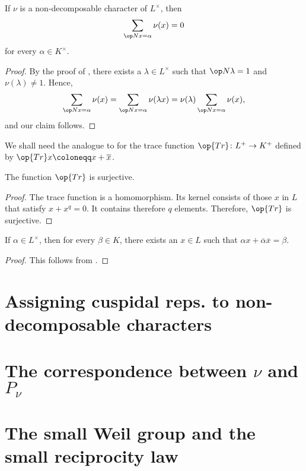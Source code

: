 \documentclass[../main.tex]{subfiles}
\begin{document}
\begin{lemma}
	If $\nu$ is a non-decomposable character of $L^\times$, then
	\[\sum_{\op Nx=\alpha}\nu(x)=0\]
	for every $\alpha\in K^\times$.
\end{lemma}
\begin{proof}
	By the proof of , there exists a $\lambda\in L^\times$ such that $\op N\lambda=1$ and $\nu(\lambda)\ne1$. Hence,
	\[\sum_{\op Nx=\alpha}\nu(x)=\sum_{\op Nx=\alpha}\nu(\lambda x)=\nu(\lambda)\sum_{\op Nx=\alpha}\nu(x),\]
	and our claim follows.
\end{proof}

We shall need the analogue to  for the trace function $\op{Tr}\colon L^+\to K^+$ defined by $\op{Tr}x\coloneqq x+\overline x$.
\begin{lemma} \label{lem:tr-epi}
	The function $\op{Tr}$ is surjective.
\end{lemma}
\begin{proof}
	The trace function is a homomorphism. Its kernel consists of those $x$ in $L$ that satisfy $x+x^q=0$. It contains therefore $q$ elements. Therefore, $\op{Tr}$ is surjective.
\end{proof}
\begin{corollary}
	If $\alpha\in L^\times$, then for every $\beta\in K$, there exists an $x\in L$ such that $\alpha x+\overline\alpha\overline x=\beta$.
\end{corollary}
\begin{proof}
	This follows from .
\end{proof}

\section{Assigning cuspidal reps. to non-decomposable characters}

\section{The correspondence between \texorpdfstring{$\nu$}{ v} and \texorpdfstring{$P_\nu$}{ Pv}}

\section{The small Weil group and the small reciprocity law} \label{sec:weil-group}
\end{document}
